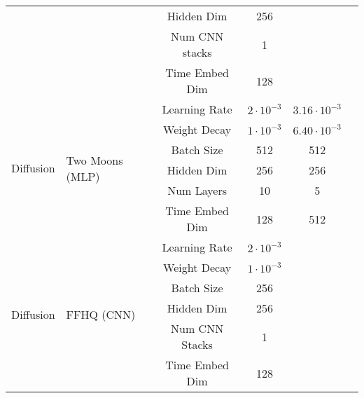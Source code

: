 \documentclass{article}
\begin{document}
\begin{table}[h]
\begin{tabular}{llcccc}
		                               &                                  & Hidden Dim              & 256                &                     \\
		                               &                                  & Num CNN stacks          & 1                  &                     \\
		                               &                                  & Time Embed Dim          & 128                &                     \\
		\midrule
		\multirow{6}{*}{Diffusion}     & \multirow{6}{*}{Two Moons (MLP)}
		                               & Learning Rate                    & $2\cdot10^{-3}$         & $3.16\cdot10^{-3}$                       \\
		                               &                                  & Weight Decay            & $1\cdot10^{-3}$    & $6.40\cdot10^{-3}$  \\
		                               &                                  & Batch Size              & 512                & 512                 \\
		                               &                                  & Hidden Dim              & 256                & 256                 \\
		                               &                                  & Num Layers              & 10                 & 5                   \\
		                               &                                  & Time Embed Dim          & 128                & 512                 \\
		\midrule
		\multirow{6}{*}{Diffusion}     & \multirow{6}{*}{FFHQ (CNN)}
		                               & Learning Rate                    & $2\cdot10^{-3}$         &                                          \\
		                               &                                  & Weight Decay            & $1\cdot10^{-3}$    &                     \\
		                               &                                  & Batch Size              & 256                &                     \\
		                               &                                  & Hidden Dim              & 256                &                     \\
		                               &                                  & Num CNN Stacks          & 1                  &                     \\
		                               &                                  & Time Embed Dim          & 128                &                     \\
		\bottomrule
	\end{tabular}
\end{table}




\end{document}
